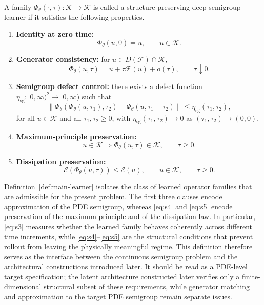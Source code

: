 \documentclass[hidelinks,review,nohypdvips,onefignum,onetabnum]{siamart220329}
\newcounter{problem}[section]
\newcommand{\cK}{\mathcal{K}}
\newcommand{\cE}{\mathcal{E}}
\newcommand{\cF}{\mathcal{F}}
\newcommand{\PhiT}{\Phi_{\theta}}
\newcommand{\norm}[1]{\left\lVert #1 \right\rVert}
\begin{document}
\begin{definition}\label{def:main-learner}
A family \(\PhiT(\cdot,\tau):\cK\to \cK\) is called a structure-preserving deep semigroup learner if it satisfies the following properties.
\begin{enumerate}[label=(S\arabic*)]
    \item \textbf{Identity at zero time:}
    \begin{equation}\label{eq:s1}
    \PhiT(u,0)=u, \qquad u\in \cK.
    \end{equation}

    \item \textbf{Generator consistency:}
    for \(u\in D(\cF)\cap \cK\),
    \begin{equation}\label{eq:s2}
    \PhiT(u,\tau)=u+\tau\cF(u)+o(\tau), \qquad \tau\downarrow 0.
    \end{equation}

    \item \textbf{Semigroup defect control:}
    there exists a defect function \(\eta_{\mathrm{sg}}:[0,\infty)^2\to [0,\infty)\) such that
    \begin{equation}\label{eq:s3}
    \norm{\PhiT(\PhiT(u,\tau_1),\tau_2)-\PhiT(u,\tau_1+\tau_2)} \le \eta_{\mathrm{sg}}(\tau_1,\tau_2),
    \end{equation}
    for all \(u\in \cK\) and all \(\tau_1,\tau_2\ge 0\), with \(\eta_{\mathrm{sg}}(\tau_1,\tau_2)\to 0\) as \((\tau_1,\tau_2)\to (0,0)\).

    \item \textbf{Maximum-principle preservation:}
    \begin{equation}\label{eq:s4}
    u\in \cK \Longrightarrow \PhiT(u,\tau)\in \cK, \qquad \tau\ge 0.
    \end{equation}

    \item \textbf{Dissipation preservation:}
    \begin{equation}\label{eq:s5}
    \cE(\PhiT(u,\tau)) \le \cE(u), \qquad u\in \cK, \qquad \tau\ge 0.
    \end{equation}
\end{enumerate}
\end{definition}

Definition~\ref{def:main-learner} isolates the class of learned operator families that are admissible for the present problem. The first three clauses encode approximation of the PDE semigroup, whereas \eqref{eq:s4} and \eqref{eq:s5} encode preservation of the maximum principle and of the dissipation law. In particular, \eqref{eq:s3} measures whether the learned family behaves coherently across different time increments, while \eqref{eq:s4}--\eqref{eq:s5} are the structural conditions that prevent rollout from leaving the physically meaningful regime. This definition therefore serves as the interface between the continuous semigroup problem and the architectural constructions introduced later. It should be read as a PDE-level target specification; the latent architecture constructed later verifies only a finite-dimensional structural subset of these requirements, while generator matching and approximation to the target PDE semigroup remain separate issues.
\end{document}

